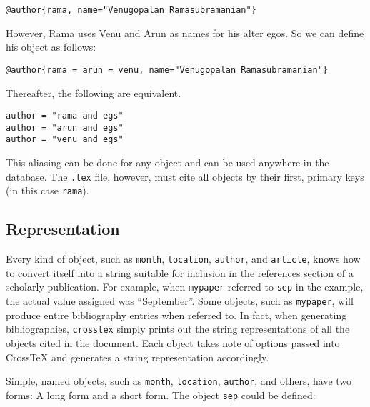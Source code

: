 \documentclass{article}
\begin{document}
\begin{small}\begin{verbatim}
@author{rama, name="Venugopalan Ramasubramanian"}
\end{verbatim}\end{small}

However, Rama uses Venu and Arun as names for his alter egos. So we can define his object as follows:

\begin{small}\begin{verbatim}
@author{rama = arun = venu, name="Venugopalan Ramasubramanian"}
\end{verbatim}\end{small}

Thereafter, the following are equivalent.

\begin{small}\begin{verbatim}
author = "rama and egs"
author = "arun and egs"
author = "venu and egs"
\end{verbatim}\end{small}

This aliasing can be done for any object and can be used anywhere in the database. The \texttt{.tex} file, however, must cite all objects by their first, primary keys (in this case \texttt{rama}).


\subsection{Representation}

Every kind of object, such as \texttt{month}, \texttt{location}, \texttt{author}, and \texttt{article}, knows how to convert itself into a string suitable for inclusion in the references section of a scholarly publication. For example, when \texttt{mypaper} referred to \texttt{sep} in the example, the actual value assigned was ``September''. Some objects, such as \texttt{mypaper}, will produce entire bibliography entries when referred to. In fact, when generating bibliographies, \texttt{crosstex} simply prints out the string representations of all the objects cited in the document.  Each object takes note of options passed into CrossTeX and generates a string representation accordingly.

Simple, named objects, such as \texttt{month}, \texttt{location}, \texttt{author}, and others, have two forms: A long form and a short form. The object \texttt{sep} could be defined:
\end{document}
